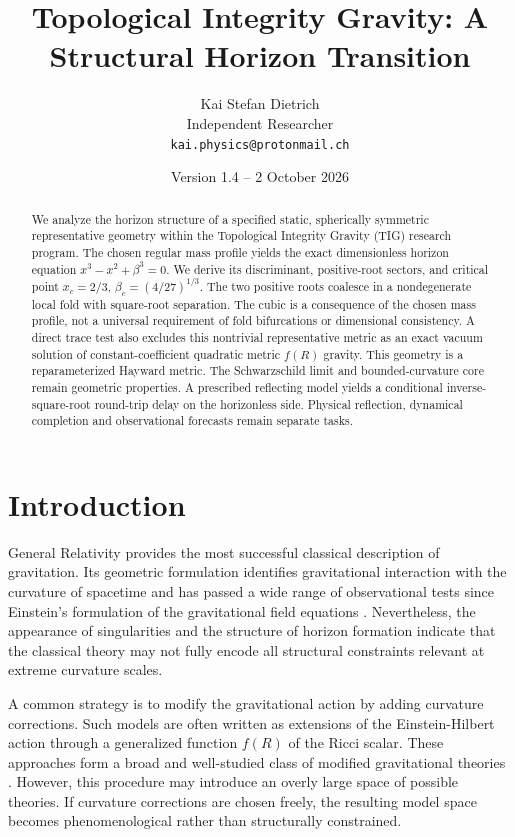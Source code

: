 \documentclass[11pt,a4paper]{article}
\title{Topological Integrity Gravity: A Structural Horizon Transition}
\author{
Kai Stefan Dietrich\\
Independent Researcher\\
\texttt{kai.physics@protonmail.ch}
}
\date{Version 1.4 -- 2 October 2026}
\begin{document}
\maketitle
\thispagestyle{plain}

\begin{abstract}
We analyze the horizon structure of a specified static, spherically symmetric
representative geometry within the Topological Integrity Gravity (TIG) research
program. The chosen regular mass profile yields the exact dimensionless horizon
equation \(x^3-x^2+\beta^3=0\). We derive its discriminant, positive-root sectors,
and critical point \(x_c=2/3\), \(\beta_c=(4/27)^{1/3}\). The two positive roots
coalesce in a nondegenerate local fold with square-root separation. The cubic
is a consequence of the chosen mass profile, not a universal requirement of
fold bifurcations or dimensional consistency. A direct trace test also excludes
this nontrivial representative metric as an exact vacuum solution of
constant-coefficient quadratic metric \(f(R)\) gravity. This geometry is a reparameterized Hayward metric.
The Schwarzschild limit and bounded-curvature core remain geometric properties.
A prescribed reflecting model yields a conditional inverse-square-root
round-trip delay on the horizonless side. Physical reflection, dynamical
completion and observational forecasts remain separate tasks.
\end{abstract}

\section{Introduction}

General Relativity provides the most successful classical description of
gravitation. Its geometric formulation identifies gravitational interaction with
the curvature of spacetime and has passed a wide range of observational tests
since Einstein's formulation of the gravitational field equations
\cite{einstein1915,wald1984,carroll2004}. Nevertheless, the appearance of
singularities and the structure of horizon formation indicate that the classical
theory may not fully encode all structural constraints relevant at extreme
curvature scales.

A common strategy is to modify the gravitational action by adding curvature
corrections. Such models are often written as extensions of the Einstein-Hilbert
action through a generalized function \(f(R)\) of the Ricci scalar. These
approaches form a broad and well-studied class of modified gravitational
theories \cite{sotiriou2010,nojiri2011,faraoni2010}. However, this procedure may
introduce an overly large space of possible theories. If curvature corrections
are chosen freely, the resulting model space becomes phenomenological rather
than structurally constrained.
\end{document}
